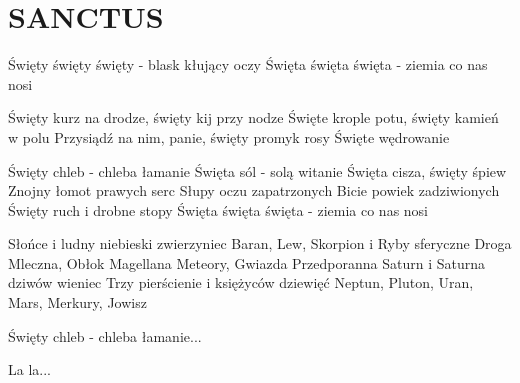 \documentclass[../../../songbook.tex]{subfiles}
\begin{document}
\TabPositions{8cm} %
\section*{SANCTUS}	
\vspace{0.5cm}
			
Święty święty święty - blask kłujący oczy \newline
Święta święta święta - ziemia co nas nosi \newline
	
Święty kurz na drodze, święty kij przy nodze	 \newline
Święte krople potu, święty kamień w polu	    \newline
Przysiądź na nim, panie, święty promyk rosy	    \newline
Święte wędrowanie					            \newline

\-\hspace{1cm} Święty chleb - chleba łamanie	 \newline
\-\hspace{1cm} Święta sól - solą witanie		 \newline
\-\hspace{1cm} Święta cisza, święty śpiew		 \newline
\-\hspace{1cm} Znojny łomot prawych serc		 \newline
\-\hspace{1cm} Słupy oczu zapatrzonych			\newline
\-\hspace{1cm} Bicie powiek zadziwionych		\newline
\-\hspace{1cm} Święty ruch i drobne stopy		\newline
\-\hspace{1cm} Święta święta święta - ziemia co nas nosi \newline

Słońce i ludny niebieski zwierzyniec		 \newline
Baran, Lew, Skorpion i Ryby sferyczne		 \newline
Droga Mleczna, Obłok Magellana			     \newline
Meteory, Gwiazda Przedporanna			     \newline
Saturn i Saturna dziwów wieniec			\newline
Trzy pierścienie i księżyców dziewięć	\newline
Neptun, Pluton, Uran, Mars, Merkury, Jowisz  \newline
	
\-\hspace{1cm} Święty chleb - chleba łamanie... \newline

La la...
\end{document}
